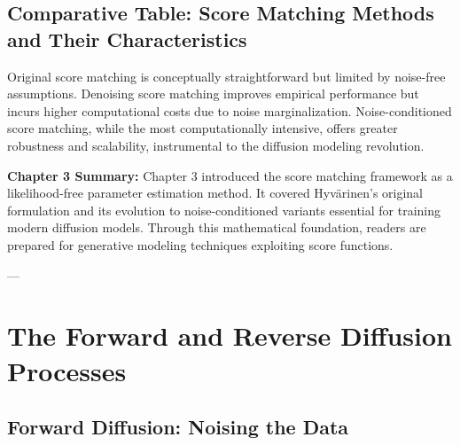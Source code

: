 \documentclass[a4paper,12pt,oneside]{memoir}
\begin{document}
\section{Comparative Table: Score Matching Methods and Their Characteristics}

\begin{table}[h]
\centering
{}
\caption{Comparison of Score Matching Approaches}
\end{table}

Original score matching is conceptually straightforward but limited by noise-free assumptions. Denoising score matching improves empirical performance but incurs higher computational costs due to noise marginalization. Noise-conditioned score matching, while the most computationally intensive, offers greater robustness and scalability, instrumental to the diffusion modeling revolution.

\textbf{Chapter 3 Summary:}  
Chapter 3 introduced the score matching framework as a likelihood-free parameter estimation method. It covered Hyvärinen’s original formulation and its evolution to noise-conditioned variants essential for training modern diffusion models. Through this mathematical foundation, readers are prepared for generative modeling techniques exploiting score functions.

---

\chapter{The Forward and Reverse Diffusion Processes}

\section{Forward Diffusion: Noising the Data}
\end{document}
